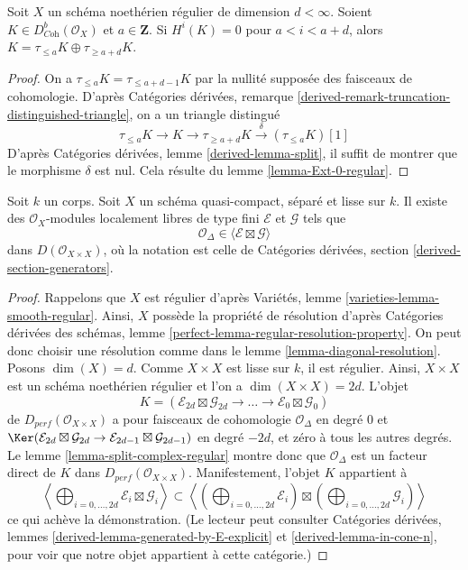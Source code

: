 \begin{lemma}
\label{lemma-split-complex-regular}
Soit $X$ un schéma noethérien régulier de dimension $d < \infty$.
Soient $K \in D^b_{\textit{Coh}}(\mathcal{O}_X)$ et $a \in \mathbf{Z}$.
Si $H^i(K) = 0$ pour $a < i < a + d$, alors
$K = \tau_{\leq a}K \oplus \tau_{\geq a + d}K$.
\end{lemma}

\begin{proof}
On a $\tau_{\leq a}K = \tau_{\leq a + d - 1}K$ par la nullité supposée
des faisceaux de cohomologie. D'après Catégories dérivées, remarque
\ref{derived-remark-truncation-distinguished-triangle},
on a un triangle distingué
$$
\tau_{\leq a}K \to K \to \tau_{\geq a + d}K \xrightarrow{\delta}
(\tau_{\leq a}K)[1]
$$
D'après Catégories dérivées, lemme \ref{derived-lemma-split}, il
suffit de montrer que le morphisme $\delta$ est nul.
Cela résulte du lemme \ref{lemma-Ext-0-regular}.
\end{proof}

\begin{lemma}
\label{lemma-diagonal-trick}
Soit $k$ un corps. Soit $X$ un schéma quasi-compact, séparé et lisse sur $k$.
Il existe des $\mathcal{O}_X$-modules localement libres de type fini
$\mathcal{E}$ et $\mathcal{G}$ tels que
$$
\mathcal{O}_\Delta \in \langle \mathcal{E} \boxtimes \mathcal{G} \rangle
$$
dans $D(\mathcal{O}_{X \times X})$, où la notation est celle de
Catégories dérivées, section \ref{derived-section-generators}.
\end{lemma}

\begin{proof}
Rappelons que $X$ est régulier d'après
Variétés, lemme \ref{varieties-lemma-smooth-regular}.
Ainsi, $X$ possède la propriété de résolution d'après
Catégories dérivées des schémas, lemme
\ref{perfect-lemma-regular-resolution-property}.
On peut donc choisir une résolution comme dans le lemme \ref{lemma-diagonal-resolution}.
Posons $\dim(X) = d$. Comme $X \times X$ est lisse sur $k$, il est régulier.
Ainsi, $X \times X$ est un schéma noethérien régulier et l'on a
$\dim(X \times X) = 2d$. L'objet
$$
K = (\mathcal{E}_{2d} \boxtimes \mathcal{G}_{2d} \to
\ldots \to
\mathcal{E}_0 \boxtimes \mathcal{G}_0)
$$
de $D_{perf}(\mathcal{O}_{X \times X})$
a pour faisceaux de cohomologie $\mathcal{O}_\Delta$
en degré $0$ et $\Ker(\mathcal{E}_{2d} \boxtimes \mathcal{G}_{2d} \to
\mathcal{E}_{2d-1} \boxtimes \mathcal{G}_{2d-1})$ en degré $-2d$, et zéro
à tous les autres degrés.
Le lemme \ref{lemma-split-complex-regular} montre donc que
$\mathcal{O}_\Delta$ est un facteur direct de $K$ dans
$D_{perf}(\mathcal{O}_{X \times X})$.
Manifestement, l'objet $K$ appartient à
$$
\left\langle
\bigoplus\nolimits_{i = 0, \ldots, 2d} \mathcal{E}_i \boxtimes \mathcal{G}_i
\right\rangle
\subset
\left\langle
\left(\bigoplus\nolimits_{i = 0, \ldots, 2d} \mathcal{E}_i\right)
\boxtimes
\left(\bigoplus\nolimits_{i = 0, \ldots, 2d} \mathcal{G}_i\right)
\right\rangle
$$
ce qui achève la démonstration. (Le lecteur peut consulter
Catégories dérivées, lemmes \ref{derived-lemma-generated-by-E-explicit} et
\ref{derived-lemma-in-cone-n}, pour voir que notre objet appartient à cette
catégorie.)
\end{proof}

